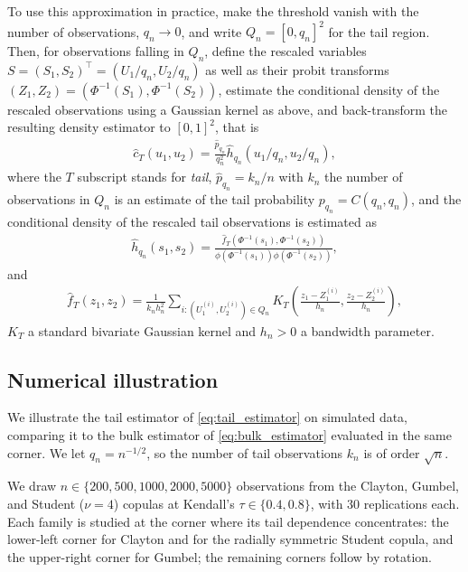 \documentclass[12pt, headinclude=true]{scrartcl}
\begin{document}
To use this approximation in practice, make the threshold vanish with the number of observations, $q_n \to 0$, and write $Q_n=[0, q_n]^2$ for the tail region.
Then, for observations falling in $Q_n$, define the rescaled variables $S=(S_1, S_2)^{\top}=(U_1/q_n,U_2/q_n)$ as well as their probit transforms $(Z_1,Z_2)=(\Phi^{-1}(S_1),\Phi^{-1}(S_2))$, estimate the conditional density of the rescaled observations using a Gaussian kernel as above, and back-transform the resulting density estimator to $[0,1]^2$, that is
\begin{align} \label{eq:tail_estimator}
  \hat c_T(u_1,u_2)
  =
  \frac{\hat p_{q_n}}{q_n^2}\hat h_{q_n}\left(u_1/q_n,u_2/q_n\right),
\end{align}
where the $T$ subscript stands for \emph{tail}, $\hat p_{q_n} = k_n/n$ with $k_n$ the number of observations in $Q_n$ is an estimate of the tail probability $p_{q_n} = C(q_n,q_n)$, and the conditional density of the rescaled tail observations is estimated as
\begin{align*}
  \hat h_{q_n}(s_1,s_2)
  =
  \frac{
    \hat f_T(\Phi^{-1}(s_1),\Phi^{-1}(s_2))
  }{
    \phi(\Phi^{-1}(s_1))\phi(\Phi^{-1}(s_2))
  },
\end{align*}
and
\begin{align*}
  \hat f_T(z_1, z_2)
  =
  \frac{1}{k_n h_n^2} \sum_{i:(U_{1}^{(i)},U_{2}^{(i)})\in Q_n}
  K_T\left(
    \frac{z_1-Z_{1}^{(i)}}{h_n},
    \frac{z_2-Z_{2}^{(i)}}{h_n}
  \right),
\end{align*}
$K_T$ a standard bivariate Gaussian kernel and $h_n>0$ a bandwidth parameter.

\subsection{Numerical illustration}

We illustrate the tail estimator of \cref{eq:tail_estimator} on simulated data, comparing it to the bulk estimator of \cref{eq:bulk_estimator} evaluated in the same corner.
We let $q_n=n^{-1/2}$, so the number of tail observations $k_n$ is of order $\sqrt n$.

We draw $n\in\{200,500,1000,2000,5000\}$ observations from the Clayton, Gumbel, and Student ($\nu=4$) copulas at Kendall's $\tau\in\{0.4,0.8\}$, with $30$ replications each.
Each family is studied at the corner where its tail dependence concentrates: the lower-left corner for Clayton and for the radially symmetric Student copula, and the upper-right corner for Gumbel; the remaining corners follow by rotation.
\end{document}
